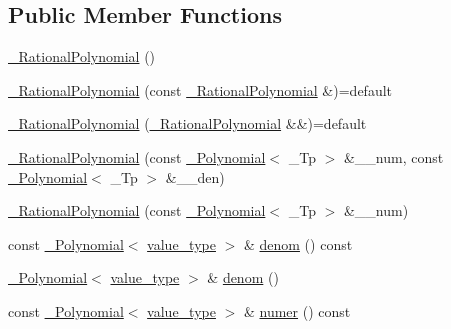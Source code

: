 \subsection*{Public Member Functions}
\begin{DoxyCompactItemize}
\item 
\hyperlink{class____gnu__cxx_1_1__RationalPolynomial_a35b2504272a73aa54b48310004c46fd1}{\+\_\+\+Rational\+Polynomial} ()
\item 
\hyperlink{class____gnu__cxx_1_1__RationalPolynomial_a7a775d294625fb0f5493051579510816}{\+\_\+\+Rational\+Polynomial} (const \hyperlink{class____gnu__cxx_1_1__RationalPolynomial}{\+\_\+\+Rational\+Polynomial} \&)=default
\item 
\hyperlink{class____gnu__cxx_1_1__RationalPolynomial_a4165c6106ef81d1c8de40c4e846462c2}{\+\_\+\+Rational\+Polynomial} (\hyperlink{class____gnu__cxx_1_1__RationalPolynomial}{\+\_\+\+Rational\+Polynomial} \&\&)=default
\item 
\hyperlink{class____gnu__cxx_1_1__RationalPolynomial_aef1f631e89bdeb2976b0629591e4e61e}{\+\_\+\+Rational\+Polynomial} (const \hyperlink{class____gnu__cxx_1_1__Polynomial}{\+\_\+\+Polynomial}$<$ \+\_\+\+Tp $>$ \&\+\_\+\+\_\+num, const \hyperlink{class____gnu__cxx_1_1__Polynomial}{\+\_\+\+Polynomial}$<$ \+\_\+\+Tp $>$ \&\+\_\+\+\_\+den)
\item 
\hyperlink{class____gnu__cxx_1_1__RationalPolynomial_ac5c31fc032a246743689ef7b86c1552f}{\+\_\+\+Rational\+Polynomial} (const \hyperlink{class____gnu__cxx_1_1__Polynomial}{\+\_\+\+Polynomial}$<$ \+\_\+\+Tp $>$ \&\+\_\+\+\_\+num)
\item 
const \hyperlink{class____gnu__cxx_1_1__Polynomial}{\+\_\+\+Polynomial}$<$ \hyperlink{class____gnu__cxx_1_1__RationalPolynomial_adeec7f1bec03111031599f337848ee8b}{value\+\_\+type} $>$ \& \hyperlink{class____gnu__cxx_1_1__RationalPolynomial_a05e84913ccfddcf6fcbfe623cb56c937}{denom} () const
\item 
\hyperlink{class____gnu__cxx_1_1__Polynomial}{\+\_\+\+Polynomial}$<$ \hyperlink{class____gnu__cxx_1_1__RationalPolynomial_adeec7f1bec03111031599f337848ee8b}{value\+\_\+type} $>$ \& \hyperlink{class____gnu__cxx_1_1__RationalPolynomial_a81fdcf1099981053c3d08ebcf8e2d278}{denom} ()
\item 
const \hyperlink{class____gnu__cxx_1_1__Polynomial}{\+\_\+\+Polynomial}$<$ \hyperlink{class____gnu__cxx_1_1__RationalPolynomial_adeec7f1bec03111031599f337848ee8b}{value\+\_\+type} $>$ \& \hyperlink{class____gnu__cxx_1_1__RationalPolynomial_aa42ac2f6c2368cae05ba3a3cebf0fa24}{numer} () const

\end{DoxyCompactItemize}
